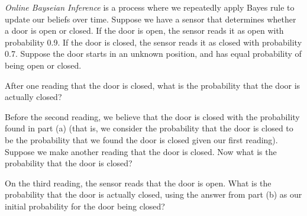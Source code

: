 \documentclass[12pt]{exam}
\begin{document}
\textit{Online Bayseian Inference} is a process where we repeatedly apply Bayes
rule to update our beliefs over time. Suppose we have a sensor that determines
whether a door is open or closed. 
If the door is open, the sensor reads it as open with probability 0.9. 
If the door is closed, the sensor reads it as closed with probability 0.7. Suppose the door starts in an unknown position, and has equal probability of being open or closed.

\begin{qparts}
    \item After one reading that the door is closed, what is the probability that the  door is actually closed?
    \item Before the second reading, we believe that the door is closed with the 
    probability found in part (a) (that is, we consider the probability that the door
    is closed to be the probability that we found the door is closed given our first reading). 
    Suppose we make another reading that the door  is closed. Now what is 
    the probability that the door is closed?
    \item On the third reading, the sensor reads that the door is open. What is 
    the probability that the door is actually closed, using the answer from part (b)
    as our initial probability for the door being closed?
\end{qparts}

\begin{solution}

\end{solution}
\end{document}
